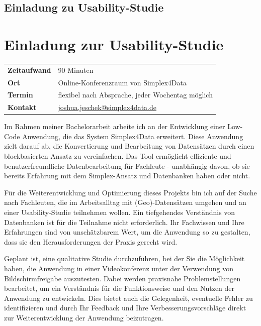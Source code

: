 \ifdefined\STANDALONE
  \section*{Einladung zu Usability-Studie}
\else
  \chapter{Einladung zur Usability-Studie}
  \label{app:invitation}
\fi

\begin{tabular}{ l l }
  \textbf{Zeitaufwand} & 90 Minuten                                                                   \\
  \textbf{Ort}         & Online-Konferenzraum von Simplex4Data                                        \\
  \textbf{Termin}      & flexibel nach Absprache, jeder Wochentag möglich                             \\
  \textbf{Kontakt}     & \href{mailto:joshua.jeschek@simplex4data.de}{joshua.jeschek@simplex4data.de}
\end{tabular}

\vspace{2\baselineskip}

\noindent
Im Rahmen meiner Bachelorarbeit arbeite ich an der Entwicklung einer Low-Code Anwendung, die das System Simplex4Data erweitert. Diese Anwendung zielt darauf ab, die Konvertierung und Bearbeitung von Datensätzen durch einen blockbasierten Ansatz zu vereinfachen. Das Tool ermöglicht effiziente und benutzerfreundliche Datenbearbeitung für Fachleute - unabhängig davon, ob sie bereits Erfahrung mit dem Simplex-Ansatz und Datenbanken haben oder nicht.

Für die Weiterentwicklung und Optimierung dieses Projekts bin ich auf der Suche nach Fachleuten, die im Arbeitsalltag mit (Geo)-Datensätzen umgehen und an einer Usability-Studie teilnehmen wollen. Ein tiefgehendes Verständnis von Datenbanken ist für die Teilnahme nicht erforderlich. Ihr Fachwissen und Ihre Erfahrungen sind von unschätzbarem Wert, um die Anwendung so zu gestalten, dass sie den Herausforderungen der Praxis gerecht wird.

Geplant ist, eine qualitative Studie durchzuführen, bei der Sie die Möglichkeit haben, die Anwendung in einer Videokonferenz unter der Verwendung von Bildschirmfreigabe auszutesten. Dabei werden praxisnahe Problemstellungen bearbeitet, um ein Verständnis für die Funktionsweise und den Nutzen der Anwendung zu entwickeln. Dies bietet auch die Gelegenheit, eventuelle Fehler zu identifizieren und durch Ihr Feedback und Ihre Verbesserungsvorschläge direkt zur Weiterentwicklung der Anwendung beizutragen.

